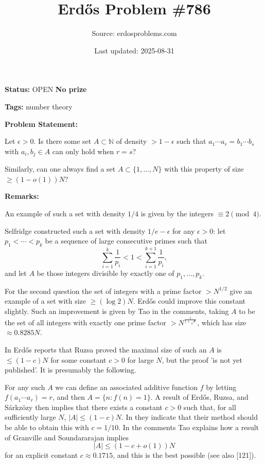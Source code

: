 \documentclass{article}
\title{Erd\H{o}s Problem \#786}
\date{Last updated: 2025-08-31}
\author{Source: erdosproblems.com}
\begin{document}
\maketitle

\noindent\textbf{Status:} OPEN \quad \textbf{No prize}

\noindent\textbf{Tags:} number theory

\medskip
\noindent\textbf{Problem Statement:}

Let $\epsilon>0$. Is there some set $A\subset \mathbb{N}$ of density $>1-\epsilon$ such that $a_1\cdots a_r=b_1\cdots b_s$ with $a_i,b_j\in A$ can only hold when $r=s$?

Similarly, can one always find a set $A\subset\{1,\ldots,N\}$ with this property of size $\geq (1-o(1))N$?

\bigskip
\noindent\textbf{Remarks:}

An example of such a set with density $1/4$ is given by the integers $\equiv 2\pmod{4}$.

Selfridge constructed such a set with density $1/e-\epsilon$ for any $\epsilon>0$: let $p_1<\cdots<p_k$ be a sequence of large consecutive primes such that\[\sum_{i=1}^k\frac{1}{p_i}<1<\sum_{i=1}^{k+1}\frac{1}{p_i},\]and let $A$ be those integers divisible by exactly one of $p_1,\ldots,p_k$.

For the second question the set of integers with a prime factor $>N^{1/2}$ give an example of a set with size $\geq (\log 2)N$. Erd\H{o}s could improve this constant slightly. Such an improvement is given by Tao in the comments, taking $A$ to be the set of all integers with exactly one prime factor $>N^{\frac{1}{1+\sqrt{e}}}$, which has size $\approx 0.8285 N$.

In \cite{Er65} Erd\H{o}s reports that Ruzsa proved the maximal size of such an $A$ is $\leq (1-c)N$ for some constant $c>0$ for large $N$, but the proof 'is not yet published'. It is presumably the following.

For any such $A$ we can define an associated additive function $f$ by letting $f(a_1\cdots a_r)=r$, and then $A=\{ n: f(n)=1\}$. A result of Erd\H{o}s, Ruzsa, and S\'{a}rkz\"{o}zy \cite{ERS73} then implies that there exists a constant $c>0$ such that, for all sufficiently large $N$, $\lvert A\rvert\leq (1-c)N$. In \cite{ERS73} they indicate that their method should be able to obtain this with $c=1/10$. In the comments Tao explains how a result of Granville and Soundararajan \cite{GrSo01} implies\[\lvert A\rvert\leq (1-c+o(1))N\]for an explicit constant $c\approx 0.1715$, and this is the best possible (see also [121]).
\end{document}
